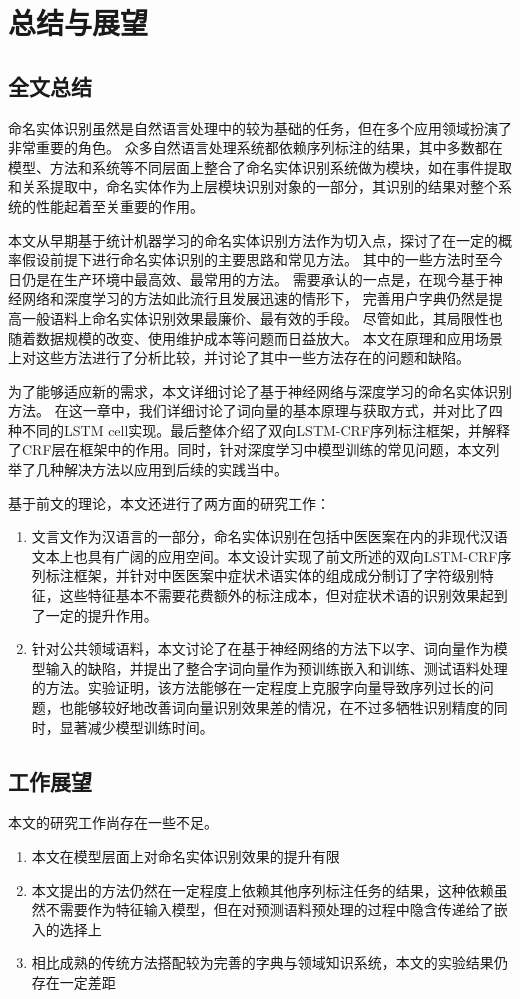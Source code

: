 \chapter{总结与展望}
\section{全文总结}
命名实体识别虽然是自然语言处理中的较为基础的任务，但在多个应用领域扮演了非常重要的角色。
众多自然语言处理系统都依赖序列标注的结果，其中多数都在模型、方法和系统等不同层面上整合了命名实体识别系统做为模块，如在事件提取和关系提取中，命名实体作为上层模块识别对象的一部分，其识别的结果对整个系统的性能起着至关重要的作用。

本文从早期基于统计机器学习的命名实体识别方法作为切入点，探讨了在一定的概率假设前提下进行命名实体识别的主要思路和常见方法。
其中的一些方法时至今日仍是在生产环境中最高效、最常用的方法。
需要承认的一点是，在现今基于神经网络和深度学习的方法如此流行且发展迅速的情形下，
完善用户字典仍然是提高一般语料上命名实体识别效果最廉价、最有效的手段。
尽管如此，其局限性也随着数据规模的改变、使用维护成本等问题而日益放大。
本文在原理和应用场景上对这些方法进行了分析比较，并讨论了其中一些方法存在的问题和缺陷。

为了能够适应新的需求，本文详细讨论了基于神经网络与深度学习的命名实体识别方法。
在这一章中，我们详细讨论了词向量的基本原理与获取方式，并对比了四种不同的LSTM cell实现。最后整体介绍了双向LSTM-CRF序列标注框架，并解释了CRF层在框架中的作用。同时，针对深度学习中模型训练的常见问题，本文列举了几种解决方法以应用到后续的实践当中。

基于前文的理论，本文还进行了两方面的研究工作：
\begin{enumerate}
    \item 文言文作为汉语言的一部分，命名实体识别在包括中医医案在内的非现代汉语文本上也具有广阔的应用空间。本文设计实现了前文所述的双向LSTM-CRF序列标注框架，并针对中医医案中症状术语实体的组成成分制订了字符级别特征，这些特征基本不需要花费额外的标注成本，但对症状术语的识别效果起到了一定的提升作用。
    \item 针对公共领域语料，本文讨论了在基于神经网络的方法下以字、词向量作为模型输入的缺陷，并提出了整合字词向量作为预训练嵌入和训练、测试语料处理的方法。实验证明，该方法能够在一定程度上克服字向量导致序列过长的问题，也能够较好地改善词向量识别效果差的情况，在不过多牺牲识别精度的同时，显著减少模型训练时间。
\end{enumerate}

\section{工作展望}
本文的研究工作尚存在一些不足。
\begin{enumerate}
    \item 本文在模型层面上对命名实体识别效果的提升有限
    \item 本文提出的方法仍然在一定程度上依赖其他序列标注任务的结果，这种依赖虽然不需要作为特征输入模型，但在对预测语料预处理的过程中隐含传递给了嵌入的选择上
    \item 相比成熟的传统方法搭配较为完善的字典与领域知识系统，本文的实验结果仍存在一定差距
\end{enumerate}


